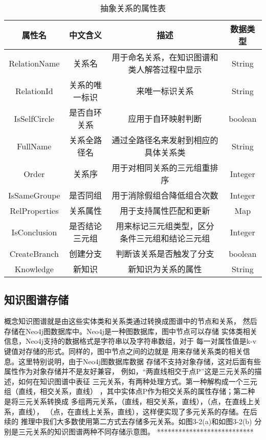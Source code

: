 \documentclass{standalone}
\begin{document}
\begin{table}[h]
	\caption{抽象关系的属性表} 
	\begin{tabular}{|c|c|c|c|} 
		\hline  
		属性名 & 中文含义 & 描述 & 数据类型\\
		\hline 
		RelationName & 关系名 & 用于命名关系，在知识图谱和类人解答过程中显示
		& String\\  
		\hline  
		RelationId & 关系的唯一标识 & 来唯一标识关系 
		& String\\  
		\hline  
		IsSelfCircle & 是否自环关系 & 应用于自环映射判断
		& boolean \\  
		\hline 
		FullName & 关系全路径名 & 通过全路径名来发射到相应的具体关系类
		& String \\  
		\hline 
		Order & 关系序 & 用于对相同关系的三元组重排序
		& Integer \\  
		\hline  
		IsSameGroupe & 是否同组 & 用于消除假组合降低组合次数
		& Integer \\  
		\hline 
		RelProperties & 关系属性 & 用于支持属性匹配和更新
		& Map \\  
		\hline 
		IsConclusion & 是否结论三元组 & 用来标记三元组类型，区分
		条件三元组和结论三元组
		& Integer \\  
		\hline 
		CreateBranch & 创建分支 & 判断该关系是否触发了分支
		& boolean \\  
		\hline 
		Knowledge & 新知识 & 新知识为关系的属性
		& String  \\  
		\hline 
	\end{tabular}
	\label{tablea}
\end{table}

\subsection{知识图谱存储}
概念知识图谱就是由这些实体类和关系类通过转换成图谱中的节点和关系，
然后存储在Neo4j图数据库中。Neo4j是一种图数据库，图中节点可以存储
实体类相关信息，Neo4j支持的数据格式是字符串以及字符串数组，对于
每一对属性值是k-v键值对存储的形式。同样的，图中节点之间的边就是
用来存储关系类的相关信息。这里特别说明，由于Neo4j图数据库数据
存储不支持对象存储，这对后面有些属性作为对象存储并不是友好兼容，
例如，“两直线相交于点P”这是三元关系的描述，如何在知识图谱中表征
三元关系，有两种处理方式。第一种解构成一个三元组（直线，相交关系，直线）
，其中实体点P作为相交关系的属性存储；第二种是将三元关系转换成
多组两元关系，（直线，相交关系，直线），（点，在直线上关系，直线），
（点，在直线上关系，直线），这样便实现了多元关系的存储。在后续的
推理中我们大多数使用第二方式去存储多元关系。如图3-2(a)和如图3-2(b)
分别是三元关系的知识图谱两种不同存储示意图。
***************************
\end{document}
